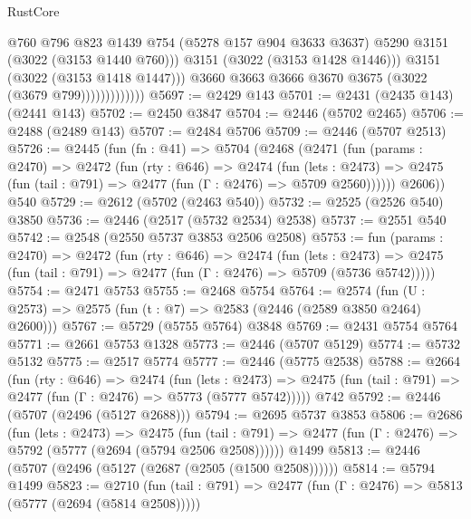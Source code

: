 \begin{lexlean}{RustCore}
\begin{coremodule}
                                @760
                                @796
                                @823
                                @1439
                                @754
                                (@5278 @157 @904 @3633 @3637)
                                @5290
                                @3151
                                (@3022 (@3153 @1440 @760)))
                              @3151
                              (@3022 (@3153 @1428 @1446)))
                            @3151
                            (@3022 (@3153 @1418 @1447)))
                          @3660
                          @3663
                          @3666
                          @3670
                          @3675
                          (@3022 (@3679 @799)))))))))))))
@5697 := @2429 @143
@5701 := @2431 (@2435 @143) (@2441 @143)
@5702 := @2450 @3847
@5704 := @2446 (@5702 @2465)
@5706 := @2488 (@2489 @143)
@5707 := @2484 @5706
@5709 := @2446 (@5707 @2513)
@5726 := @2445
    (fun (fn : @41) =>
    @5704
      (@2468
        (@2471
          (fun (params : @2470) =>
          @2472
            (fun (rty : @646) =>
            @2474
              (fun (lets : @2473) =>
              @2475 (fun (tail : @791) => @2477 (fun (Γ : @2476) => @5709 @2560))))))
        @2606))
    @540
@5729 := @2612 (@5702 (@2463 @540))
@5732 := @2525 (@2526 @540) @3850
@5736 := @2446 (@2517 (@5732 @2534) @2538)
@5737 := @2551 @540
@5742 := @2548 (@2550 @5737 @3853 @2506 @2508)
@5753 := fun (params : @2470) =>
  @2472
    (fun (rty : @646) =>
    @2474
      (fun (lets : @2473) =>
      @2475 (fun (tail : @791) => @2477 (fun (Γ : @2476) => @5709 (@5736 @5742)))))
@5754 := @2471 @5753
@5755 := @2468 @5754
@5764 := @2574 (fun (U : @2573) => @2575 (fun (t : @7) => @2583 (@2446 (@2589 @3850 @2464) @2600)))
@5767 := @5729 (@5755 @5764) @3848
@5769 := @2431 @5754 @5764
@5771 := @2661 @5753 @1328
@5773 := @2446 (@5707 @5129)
@5774 := @5732 @5132
@5775 := @2517 @5774
@5777 := @2446 (@5775 @2538)
@5788 := @2664
    (fun (rty : @646) =>
    @2474
      (fun (lets : @2473) =>
      @2475 (fun (tail : @791) => @2477 (fun (Γ : @2476) => @5773 (@5777 @5742)))))
    @742
@5792 := @2446 (@5707 (@2496 (@5127 @2688)))
@5794 := @2695 @5737 @3853
@5806 := @2686
    (fun (lets : @2473) =>
    @2475
      (fun (tail : @791) => @2477 (fun (Γ : @2476) => @5792 (@5777 (@2694 (@5794 @2506 @2508))))))
    @1499
@5813 := @2446 (@5707 (@2496 (@5127 (@2687 (@2505 (@1500 @2508))))))
@5814 := @5794 @1499
@5823 := @2710
    (fun (tail : @791) => @2477 (fun (Γ : @2476) => @5813 (@5777 (@2694 (@5814 @2508)))))

\end{coremodule}
\end{lexlean}
